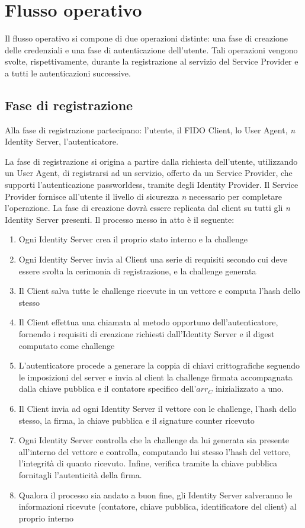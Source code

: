 \section{Flusso operativo}
\label{flusso_operativo}

Il flusso operativo si compone di due operazioni distinte: una fase di creazione delle credenziali e una fase di autenticazione dell'utente. Tali operazioni vengono svolte, rispettivamente, durante la registrazione al servizio del Service Provider e a tutti le autenticazioni successive.

\subsection{Fase di registrazione}
\label{registrazione}

Alla fase di registrazione partecipano: l'utente, il FIDO Client, lo User Agent, \emph{n} Identity Server, l'autenticatore.

La fase di registrazione si origina a partire dalla richiesta dell'utente, utilizzando un User Agent, di registrarsi ad un servizio, offerto da un Service Provider, che supporti l'autenticazione passworldess, tramite degli Identity Provider. Il Service Provider fornisce all'utente il livello di sicurezza \emph{n} necessario per completare l'operazione. La fase di creazione dovrà essere replicata dal client su tutti gli \emph{n} Identity Server presenti.  Il processo messo in atto è il seguente:

\begin{enumerate}
	\item Ogni Identity Server crea il proprio stato interno e la challenge
	\item Ogni Identity Server invia al Client una serie di requisiti secondo cui deve essere svolta la cerimonia di registrazione, e la challenge generata
	\item Il Client salva tutte le challenge ricevute in un vettore e computa l'hash dello stesso
	\item Il Client effettua una chiamata al metodo opportuno dell'autenticatore, fornendo i requisiti di creazione richiesti dall'Identity Server e il digest computato come challenge
	\item L'autenticatore procede a generare la coppia di chiavi crittografiche seguendo le imposizioni del server e invia al client la challenge firmata accompagnata dalla chiave pubblica e il contatore specifico dell'${arr_C}$ inizializzato a uno.
	\item Il Client invia ad ogni Identity Server il vettore con le challenge, l'hash dello stesso, la firma, la chiave pubblica e il signature counter ricevuto
	\item Ogni Identity Server controlla che la challenge da lui generata sia presente all'interno del vettore e controlla, computando lui stesso l'hash del vettore, l'integrità di quanto ricevuto. Infine, verifica tramite la chiave pubblica fornitagli l'autenticità della firma.
	\item Qualora il processo sia andato a buon fine, gli Identity Server salveranno le informazioni ricevute (contatore, chiave pubblica, identificatore del client) al proprio interno
\end{enumerate} 

